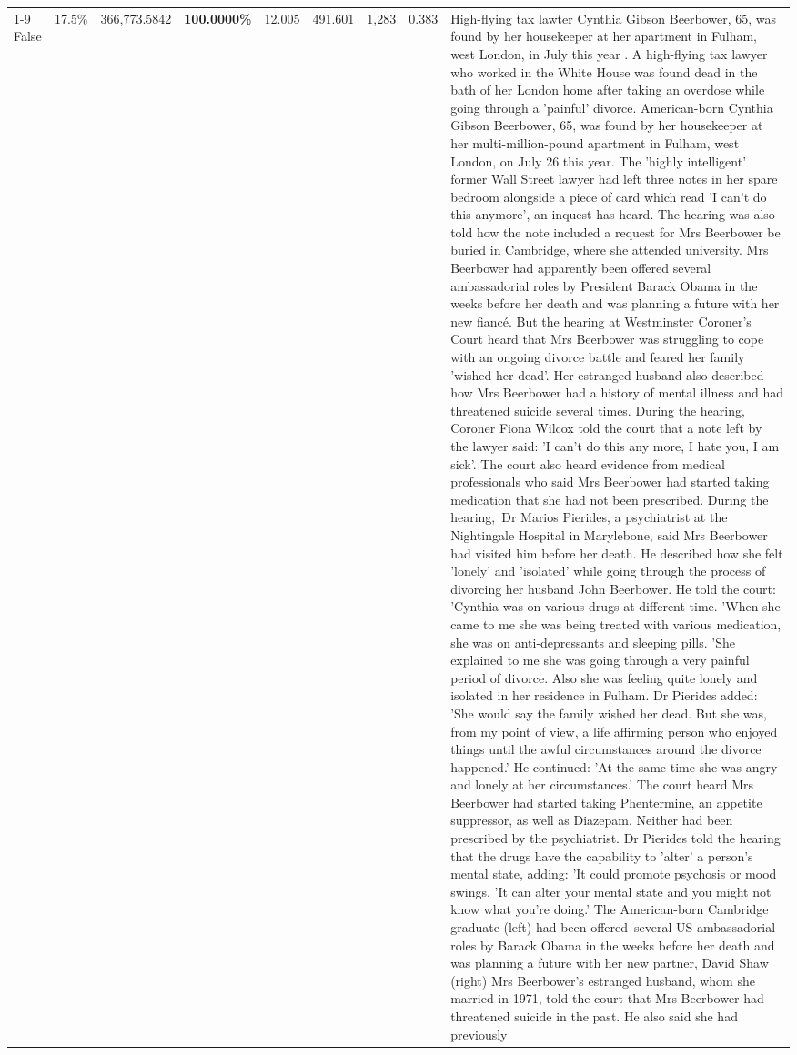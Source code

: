 \begin{table}[H]
\begin{tabular}{lllrlllll}
\cline{1-9}
False & 17.5\% & 366,773.5842 & \bfseries \color{red} 100.0000\% & 12.005 & 491.601 & 1,283 & 0.383 & High-flying tax lawter Cynthia Gibson Beerbower, 65, was found by her housekeeper at her apartment in Fulham, west London, in July this year . A high-flying tax lawyer who worked in the White House was found dead in the bath of her London home after taking an overdose while going through a 'painful' divorce. American-born Cynthia Gibson Beerbower, 65, was found by her housekeeper at her multi-million-pound apartment in Fulham, west London, on July 26 this year. The 'highly intelligent' former Wall Street lawyer had left three notes in her spare bedroom alongside a piece of card which read 'I can't do this anymore', an inquest has heard. The hearing was also told how the note included a request for Mrs Beerbower be buried in Cambridge, where she attended university. Mrs Beerbower had apparently been offered several ambassadorial roles by President Barack Obama in the weeks before her death and was planning a future with her new fiancé. But the hearing at Westminster Coroner's Court heard that Mrs Beerbower was struggling to cope with an ongoing divorce battle and feared her family 'wished her dead'. Her estranged husband also described how Mrs Beerbower had a history of mental illness and had threatened suicide several times. During the hearing, Coroner Fiona Wilcox told the court that a note left by the lawyer said: 'I can't do this any more, I hate you, I am sick'. The court also heard evidence from medical professionals who said Mrs Beerbower had started taking medication that she had not been prescribed. During the hearing, Dr Marios Pierides, a psychiatrist at the Nightingale Hospital in Marylebone, said Mrs Beerbower had visited him before her death. He described how she felt 'lonely' and 'isolated' while going through the process of divorcing her husband John Beerbower. He told the court: 'Cynthia was on various drugs at different time. 'When she came to me she was being treated with various medication, she was on anti-depressants and sleeping pills. 'She explained to me she was going through a very painful period of divorce. Also she was feeling quite lonely and isolated in her residence in Fulham. Dr Pierides added: 'She would say the family wished her dead. But she was, from my point of view, a life affirming person who enjoyed things until the awful circumstances around the divorce happened.' He continued: 'At the same time she was angry and lonely at her circumstances.' The court heard Mrs Beerbower had started taking Phentermine, an appetite suppressor, as well as Diazepam. Neither had been prescribed by the psychiatrist. Dr Pierides told the hearing that the drugs have the capability to 'alter' a person's mental state, adding: 'It could promote psychosis or mood swings. 'It can alter your mental state and you might not know what you're doing.' The American-born Cambridge graduate (left) had been offered several US ambassadorial roles by Barack Obama in the weeks before her death and was planning a future with her new partner, David Shaw (right) Mrs Beerbower's estranged husband, whom she married in 1971, told the court that Mrs Beerbower had threatened suicide in the past. He also said she had previously 
\end{tabular}
\end{table}
